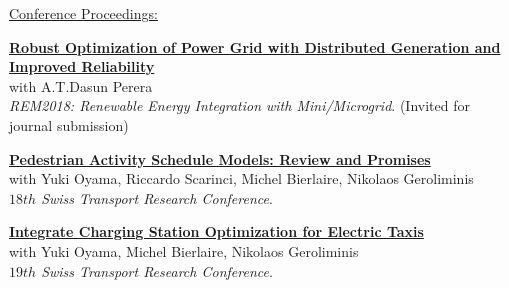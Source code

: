 \documentclass[letterpaper,11pt]{article}
\begin{document}
\underline{\sc \small Conference Proceedings:}
\begin{myitemize}
	
	\item \href{https://doi.org/10.1016/j.egypro.2018.12.069}{\bf Robust Optimization of Power Grid with Distributed Generation and Improved Reliability}\\ {with A.T.Dasun Perera}\\ {{\it REM2018: Renewable Energy Integration with Mini/Microgrid}. (Invited for journal submission)}
	\item \href{https://www.strc.ch/2018/Wang_EtAl.pdf}{\bf Pedestrian Activity Schedule Models: Review and Promises}\\ {with Yuki Oyama, Riccardo Scarinci, Michel Bierlaire, Nikolaos Geroliminis}\\ {{\it $18{th}$ Swiss Transport
Research Conference}.} 
	\item \href{https://www.semanticscholar.org/paper/Integrated-optimization-of-charging-stations-for-Wang-Oyama/e318225a6633fe4edaa9824133346d4af707c231?utm_source=direct_link}{\bf Integrate Charging Station Optimization for Electric Taxis}\\ {with Yuki Oyama, Michel Bierlaire,  Nikolaos Geroliminis}\\ {{\it $19{th}$ Swiss Transport
Research Conference}.} 
	
	
	\end{myitemize}
%	
\end{document}
